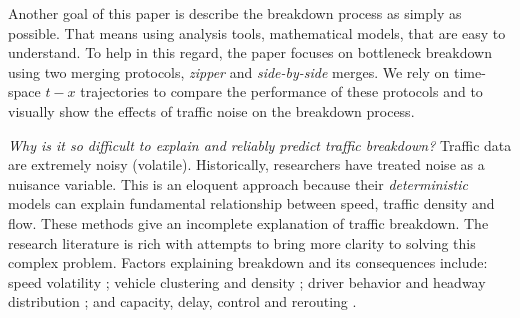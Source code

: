 \documentclass[Proceedings]{ascelike}
\begin{document}
Another goal of this paper is describe the breakdown process as simply as possible. That means using analysis tools, mathematical models, that are easy to understand. To help in this regard, the paper focuses on bottleneck breakdown using two merging protocols, \emph{zipper} and \emph{side-by-side} merges. We rely on time-space $t-x$ trajectories to compare the performance of these protocols and to visually show the effects of traffic noise on the breakdown process.

\emph{Why is it so difficult to explain and reliably predict traffic breakdown?} Traffic data are extremely noisy (volatile). Historically, researchers have treated noise as a nuisance variable. This is an eloquent  approach because their \emph{deterministic} models can explain fundamental relationship between speed, traffic density and flow. These methods give an incomplete explanation of traffic breakdown. The  research literature is rich with attempts to bring more clarity to solving this complex problem.  Factors explaining breakdown and its consequences include: speed volatility  \cite{WAGNER20121384}; vehicle clustering and density \cite{CASTILLO2001367}   \cite{GALTIER2012167} \cite{KISH2000271} \cite{MAHNKE20051} \cite{WEITS1992115}; driver behavior and headway distribution  \cite{OU2018105}; and capacity, delay, control and rerouting \cite{HU2018254} \cite{SMULDERS1990221} \cite{VODOPIVEC201722}. 
\end{document}
